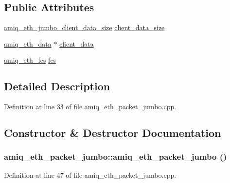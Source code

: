 \subsection*{Public Attributes}
\begin{DoxyCompactItemize}
\item 
\hyperlink{amiq__eth__types_8cpp_a91e895e78bf9f23c2cab9db2fb280e8b}{amiq\_\-eth\_\-jumbo\_\-client\_\-data\_\-size} \hyperlink{classamiq__eth__packet__jumbo_ac651c15c773a591d6ea0a84dc2f87c31}{client\_\-data\_\-size}
\item 
\hyperlink{amiq__eth__types_8cpp_a3595a0a508d433d383d3e5521fc0b723}{amiq\_\-eth\_\-data} $\ast$ \hyperlink{classamiq__eth__packet__jumbo_a88160a7a89c8c9cbb8ad2603dfa64c8b}{client\_\-data}
\item 
\hyperlink{amiq__eth__types_8cpp_adb511dc715b55539c6abdad1de981a9f}{amiq\_\-eth\_\-fcs} \hyperlink{classamiq__eth__packet__jumbo_a64e909b3c1041768d6fabe8bc0d0b634}{fcs}
\end{DoxyCompactItemize}


\subsection{Detailed Description}


Definition at line 33 of file amiq\_\-eth\_\-packet\_\-jumbo.cpp.

\subsection{Constructor \& Destructor Documentation}
\hypertarget{classamiq__eth__packet__jumbo_a860096fdee8dda024573e33010090017}{
\subsubsection[{amiq\_\-eth\_\-packet\_\-jumbo}]{\setlength{\rightskip}{0pt plus 5cm}amiq\_\-eth\_\-packet\_\-jumbo::amiq\_\-eth\_\-packet\_\-jumbo ()}}
\label{classamiq__eth__packet__jumbo_a860096fdee8dda024573e33010090017}


Definition at line 47 of file amiq\_\-eth\_\-packet\_\-jumbo.cpp.

